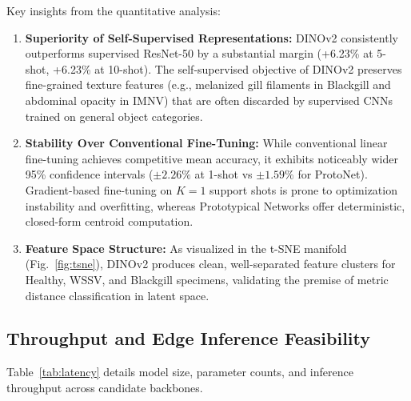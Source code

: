 \documentclass[conference]{IEEEtran}
\begin{document}
Key insights from the quantitative analysis:
\begin{enumerate}
    \item \textbf{Superiority of Self-Supervised Representations:} DINOv2 consistently outperforms supervised ResNet-50 by a substantial margin (+6.23\% at 5-shot, +6.23\% at 10-shot). The self-supervised objective of DINOv2 preserves fine-grained texture features (e.g., melanized gill filaments in Blackgill and abdominal opacity in IMNV) that are often discarded by supervised CNNs trained on general object categories.
    \item \textbf{Stability Over Conventional Fine-Tuning:} While conventional linear fine-tuning achieves competitive mean accuracy, it exhibits noticeably wider 95\% confidence intervals ($\pm 2.26\%$ at 1-shot vs $\pm 1.59\%$ for ProtoNet). Gradient-based fine-tuning on $K=1$ support shots is prone to optimization instability and overfitting, whereas Prototypical Networks offer deterministic, closed-form centroid computation.
    \item \textbf{Feature Space Structure:} As visualized in the t-SNE manifold (Fig.~\ref{fig:tsne}), DINOv2 produces clean, well-separated feature clusters for Healthy, WSSV, and Blackgill specimens, validating the premise of metric distance classification in latent space.
\end{enumerate}

\subsection{Throughput and Edge Inference Feasibility}

Table~\ref{tab:latency} details model size, parameter counts, and inference throughput across candidate backbones.

\begin{table}[htbp]
\caption{Model Complexity and Inference Throughput Comparison}
\label{tab:latency}
\centering
{}
\end{table}
\end{document}
